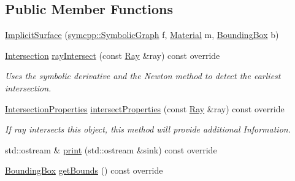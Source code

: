 \subsection*{Public Member Functions}
\begin{DoxyCompactItemize}
\item 
\hyperlink{classImplicitSurface_ab0cfa235e8f935a416c395cfecd2f32b}{Implicit\+Surface} (\hyperlink{classsymcpp_1_1SymbolicGraph}{symcpp\+::\+Symbolic\+Graph} f, \hyperlink{classMaterial}{Material} m, \hyperlink{classBoundingBox}{Bounding\+Box} b)
\item 
\hyperlink{classIntersection}{Intersection} \hyperlink{classImplicitSurface_a09b05170e1ff9d443c0c0ff9c33824f8}{ray\+Intersect} (const \hyperlink{classRay}{Ray} \&ray) const override
\begin{DoxyCompactList}\small\item\em Uses the symbolic derivative and the Newton method to detect the earliest intersection. \end{DoxyCompactList}\item 
\hyperlink{classIntersectionProperties}{Intersection\+Properties} \hyperlink{classImplicitSurface_a8ce29f3d491a01f1992a2ae534ee6bea}{intersect\+Properties} (const \hyperlink{classRay}{Ray} \&ray) const override
\begin{DoxyCompactList}\small\item\em If ray intersects this object, this method will provide additional Information. \end{DoxyCompactList}\item 
std\+::ostream \& \hyperlink{classImplicitSurface_a2267c88829c97c12ff8f7d250ce94802}{print} (std\+::ostream \&sink) const override
\item 
\hyperlink{classBoundingBox}{Bounding\+Box} \hyperlink{classImplicitSurface_a8fd17a82a612fc8d15c5973cb497c48b}{get\+Bounds} () const override
\end{DoxyCompactItemize}
